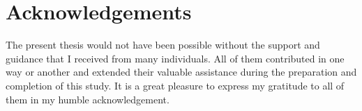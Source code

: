

\chapter*{Acknowledgements}

\label{Acknowledgements} %


The present thesis would not have been possible without the support and guidance that I received from many individuals. All of them contributed in one way or another and extended their valuable assistance during the preparation and completion of this study. It is a great pleasure to express my gratitude to all of them in my humble acknowledgement. 

            
               
\par\bigskip 

